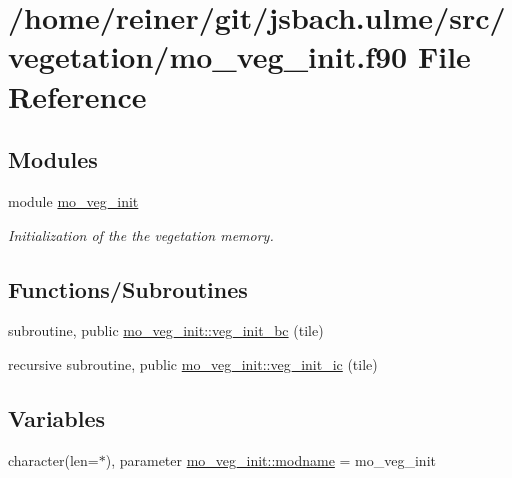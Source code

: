 \hypertarget{mo__veg__init_8f90}{}\section{/home/reiner/git/jsbach.ulme/src/vegetation/mo\+\_\+veg\+\_\+init.f90 File Reference}
\label{mo__veg__init_8f90}
\subsection*{Modules}
\begin{DoxyCompactItemize}
\item 
module \hyperlink{namespacemo__veg__init}{mo\+\_\+veg\+\_\+init}
\begin{DoxyCompactList}\small\item\em Initialization of the the vegetation memory. \end{DoxyCompactList}\end{DoxyCompactItemize}
\subsection*{Functions/\+Subroutines}
\begin{DoxyCompactItemize}
\item 
subroutine, public \hyperlink{namespacemo__veg__init_a51acdbb676d276054d328e045605f688}{mo\+\_\+veg\+\_\+init\+::veg\+\_\+init\+\_\+bc} (tile)
\item 
recursive subroutine, public \hyperlink{namespacemo__veg__init_a1f3c0830f53331836f61d9ed195747ae}{mo\+\_\+veg\+\_\+init\+::veg\+\_\+init\+\_\+ic} (tile)
\end{DoxyCompactItemize}
\subsection*{Variables}
\begin{DoxyCompactItemize}
\item 
character(len=$\ast$), parameter \hyperlink{namespacemo__veg__init_a29fc1d9443f5600fe324d7f02b8c3dbf}{mo\+\_\+veg\+\_\+init\+::modname} = \textquotesingle{}mo\+\_\+veg\+\_\+init\textquotesingle{}
\end{DoxyCompactItemize}
